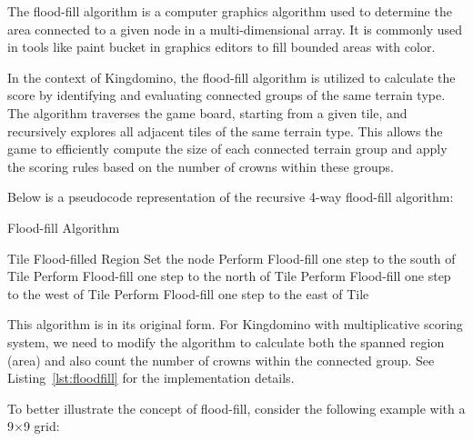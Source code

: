 \documentclass[conference]{IEEEtran}
\begin{document}
The flood-fill algorithm is a computer graphics algorithm used to determine the
area connected to a given node in a multi-dimensional array. It is commonly
used in tools like paint bucket in graphics editors to fill bounded areas with
color.

In the context of Kingdomino, the flood-fill algorithm is utilized to calculate
the score by identifying and evaluating connected groups of the same terrain
type. The algorithm traverses the game board, starting from a given tile, and
recursively explores all adjacent tiles of the same terrain type. This allows
the game to efficiently compute the size of each connected terrain group and
apply the scoring rules based on the number of crowns within these groups.

Below is a pseudocode representation of the recursive 4-way flood-fill
algorithm:

\begin{algorithm}[htbp]
    \caption{Flood-fill Algorithm}
    \begin{algorithmic}
        \Require Tile
        \Ensure Flood-filled Region
            \Return
        \EndIf
        \State Set the node
        \State Perform Flood-fill one step to the south of Tile
        \State Perform Flood-fill one step to the north of Tile
        \State Perform Flood-fill one step to the west of Tile
        \State Perform Flood-fill one step to the east of Tile\\
        \Return
    \end{algorithmic}
\end{algorithm}

This algorithm is in its original form. For Kingdomino with multiplicative
scoring system, we need to modify the algorithm to calculate both the spanned
region (area) and also count the number of crowns within the connected group.
See Listing~\ref{lst:floodfill} for the implementation details.

To better illustrate the concept of flood-fill, consider the following example
with a 9$\times$9 grid:
\end{document}
